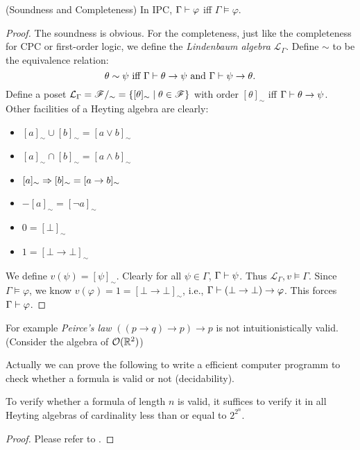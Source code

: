 \begin{theorem} (Soundness and Completeness)
    In IPC, $\Gamma\vdash\varphi$ iff $\Gamma\models\varphi$.
\end{theorem}
\newcommand{\Lindenbaum}{\mathcal{L}}
\begin{proof}
    The soundness is obvious. For the completeness, just like the
    completeness for CPC or first-order logic, we define
    the {\it Lindenbaum algebra} $\Lindenbaum_\Gamma$.
    Define $\sim$ to be the equivalence relation:
    $$
        \theta\sim\psi\text{ iff }\Gamma\vdash\theta\to\psi
        \text{ and }\Gamma\vdash{\psi\to\theta}.
    $$
    Define a poset $\Lindenbaum_\Gamma=\formula/_\sim=\{[\theta]_\sim
    \mid \theta\in\formula\}$ with order $[\theta]_\sim$ iff $\Gamma
    \vdash\theta\to\psi$. Other facilities of a Heyting algebra are
    clearly:
    \begin{itemize}
        \item $[a]_\sim\cup[b]_\sim=[a\vee b]_\sim$
        \item $[a]_\sim\cap[b]_\sim=[a\wedge b]_\sim$
        \item $[a]_\sim\Rightarrow[b]_\sim=[a\to b]_\sim$
        \item $-[a]_\sim=[\neg a]_\sim$
        \item $0=[\bot]_\sim$
        \item $1=[\bot\to\bot]_\sim$
    \end{itemize}
    We define $v(\psi)=[\psi]_\sim$. Clearly for all 
    $\psi\in\Gamma$, $\Gamma\vdash\psi$. Thus $\Lindenbaum_\Gamma,
    v\models \Gamma$. Since $\Gamma\models\varphi$, we know 
    $v(\varphi)=1=[\bot\to\bot]_\sim$, i.e., $\Gamma\vdash (\bot\to\bot)
    \to \varphi$. This forces $\Gamma\vdash\varphi$.
\end{proof}
For example {\it Peirce's law} $((p\to q)\to p)\to p$ is not 
intuitionistically valid. (Consider the algebra of $\mathcal{O}(\mathbb{R}^2)$)

Actually we can prove the following to write a efficient computer
programm to check whether a formula is valid or not (decidability).
\begin{theorem}
    To verify whether a formula of length $n$ is valid, it suffices
    to verify it in all Heyting algebras of cardinality less than or
    equal to $2^{2^n}$.
\end{theorem}
\begin{proof}
    Please refer to \cite{Curry-Howard}.
\end{proof}

